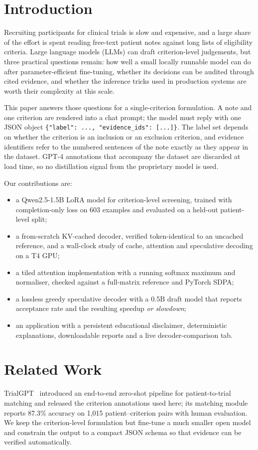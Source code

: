 \documentclass[conference]{IEEEtran}
\begin{document}
\section{Introduction}
Recruiting participants for clinical trials is slow and expensive, and a large share of the effort
is spent reading free-text patient notes against long lists of eligibility criteria. Large language
models (LLMs) can draft criterion-level judgements, but three practical questions remain: how well a
small locally runnable model can do after parameter-efficient fine-tuning, whether its decisions can
be audited through cited evidence, and whether the inference tricks used in production systems are
worth their complexity at this scale.

This paper answers those questions for a single-criterion formulation. A note and one criterion are
rendered into a chat prompt; the model must reply with one JSON object
\texttt{\{"label": ..., "evidence\_ids": [...]\}}. The label set depends on whether the criterion is
an inclusion or an exclusion criterion, and evidence identifiers refer to the numbered sentences of
the note exactly as they appear in the dataset. GPT-4 annotations that accompany the dataset are
discarded at load time, so no distillation signal from the proprietary model is used.

Our contributions are:
\begin{itemize}
  \item a Qwen2.5-1.5B LoRA model for criterion-level screening, trained with completion-only loss
        on 603 examples and evaluated on a held-out patient-level split;
  \item a from-scratch KV-cached decoder, verified token-identical to an uncached reference, and a
        wall-clock study of cache, attention and speculative decoding on a T4 GPU;
  \item a tiled attention implementation with a running softmax maximum and normaliser, checked
        against a full-matrix reference and PyTorch SDPA;
  \item a lossless greedy speculative decoder with a 0.5B draft model that reports acceptance rate
        and the resulting speedup \emph{or slowdown};
  \item an application with a persistent educational disclaimer, deterministic explanations,
        downloadable reports and a live decoder-comparison tab.
\end{itemize}

\section{Related Work}
TrialGPT~\cite{jin2024trialgpt} introduced an end-to-end zero-shot pipeline for patient-to-trial
matching and released the criterion annotations used here; its matching module reports 87.3\%
accuracy on 1{,}015 patient--criterion pairs with human evaluation. We keep the criterion-level
formulation but fine-tune a much smaller open model and constrain the output to a compact JSON
schema so that evidence can be verified automatically.
\end{document}
